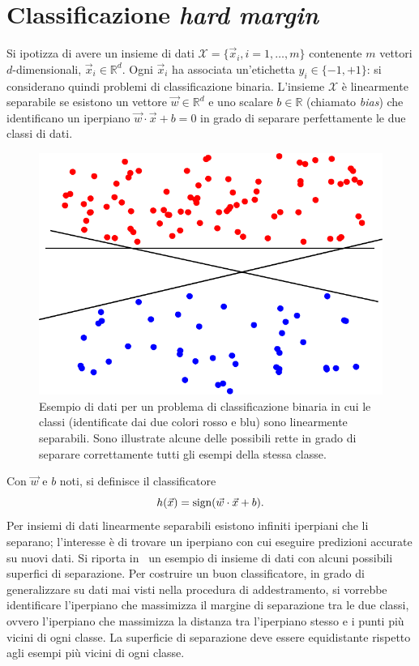 \section{Classificazione \emph{hard margin}}\label{sec:hard_margin_classifier}
Si ipotizza di avere un insieme di dati $\mathcal{X} = \{\Vec{x}_i, i=1,\dots,m\}$ contenente $m$ vettori $d$-dimensionali, $\Vec{x}_i \in \mathbb{R}^d$. 
Ogni $\Vec{x}_i$ ha associata un'etichetta $y_i \in \{-1, +1\}$: si considerano quindi problemi di classificazione binaria.
%
L'insieme $\mathcal{X}$ è linearmente separabile se esistono un vettore $\Vec{w} \in \mathbb{R}^d$ e uno scalare $b \in \mathbb{R}$ (chiamato \emph{bias}) che identificano un iperpiano $\Vec{w}\cdot \Vec{x} +b=0$ in grado di separare perfettamente le due classi di dati.
\begin{figure}
    \centering
    \includegraphics[width=0.5\linewidth]{img/dati_linearmente_separabili.pdf}
    \caption[Esempio problema classificazione binaria linearmente separabile.]{Esempio di dati per un problema di classificazione binaria in cui le classi (identificate dai due colori rosso e blu) sono linearmente separabili. Sono illustrate alcune delle possibili rette in grado di separare correttamente tutti gli esempi della stessa classe. }
    \label{fig:dati_linearmente_separabili}
\end{figure}
Con $\Vec{w}$ e $b$ noti, si definisce il classificatore 
\begin{equation*}
    h(\Vec{x}) = \mathrm{sign}(\Vec{w}\cdot \Vec{x} +b).
\end{equation*} 
Per insiemi di dati linearmente separabili esistono infiniti iperpiani che li separano; l'interesse è di trovare un iperpiano con cui eseguire predizioni accurate su nuovi dati. 
Si riporta in~ un esempio di insieme di dati con alcuni possibili superfici di separazione. 
Per costruire un buon classificatore, in grado di generalizzare su dati mai visti nella procedura di addestramento, si vorrebbe identificare l'iperpiano che massimizza il margine di separazione tra le due classi, ovvero l'iperpiano che massimizza la distanza tra l'iperpiano stesso e i punti più vicini di ogni classe.
La superficie di separazione deve essere equidistante rispetto agli esempi più vicini di ogni classe.

